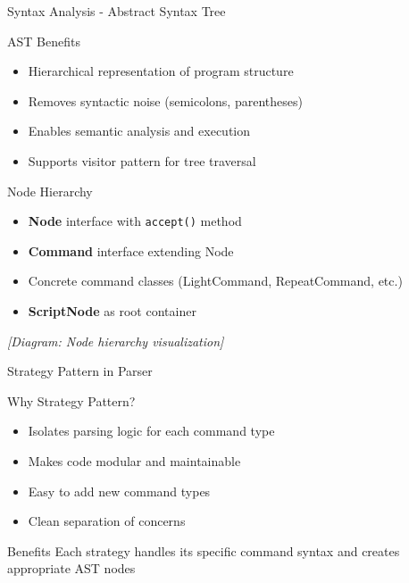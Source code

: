 \documentclass{beamer}
\begin{document}
\begin{frame}{Syntax Analysis - Abstract Syntax Tree}
\begin{block}{AST Benefits}
\begin{itemize}
    \item Hierarchical representation of program structure
    \item Removes syntactic noise (semicolons, parentheses)
    \item Enables semantic analysis and execution
    \item Supports visitor pattern for tree traversal
\end{itemize}
\end{block}

\begin{block}{Node Hierarchy}
\begin{itemize}
    \item \textbf{Node} interface with \texttt{accept()} method
    \item \textbf{Command} interface extending Node
    \item Concrete command classes (LightCommand, RepeatCommand, etc.)
    \item \textbf{ScriptNode} as root container
\end{itemize}
\end{block}

\begin{center}
\textit{[Diagram: Node hierarchy visualization]}
\end{center}
\end{frame}

\begin{frame}{Strategy Pattern in Parser}
\begin{block}{Why Strategy Pattern?}
\begin{itemize}
    \item Isolates parsing logic for each command type
    \item Makes code modular and maintainable
    \item Easy to add new command types
    \item Clean separation of concerns
\end{itemize}
\end{block}

\begin{center}
\end{center}

\begin{block}{Benefits}
Each strategy handles its specific command syntax and creates appropriate AST nodes
\end{block}
\end{frame}
\end{document}
